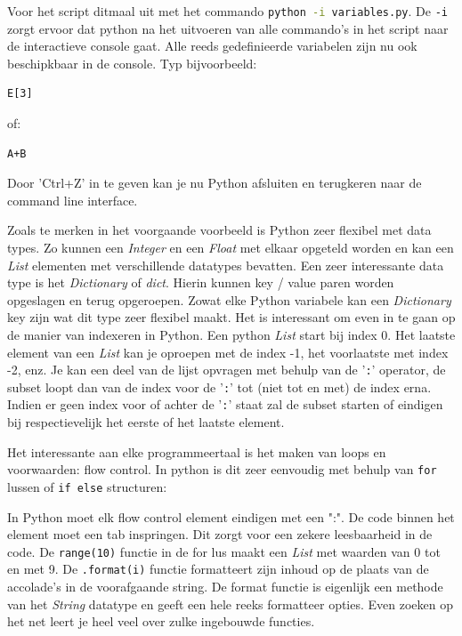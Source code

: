 \documentclass[11pt,twoside]{article}
\begin{document}
Voor het script ditmaal uit met het commando \lstinline[language=bash]{python -i variables.py}. De \lstinline[language=bash]{-i} zorgt ervoor dat python na het uitvoeren van alle commando's in het script naar de interactieve console gaat. Alle reeds gedefinieerde variabelen zijn nu ook beschipkbaar in de console. Typ bijvoorbeeld:
\begin{lstlisting}
E[3]
\end{lstlisting}
of:
\begin{lstlisting}
A+B
\end{lstlisting}
Door 'Ctrl+Z' in te geven kan je nu Python afsluiten en terugkeren naar de command line interface.

Zoals te merken in het voorgaande voorbeeld is Python zeer flexibel met data types. Zo kunnen een \emph{Integer} en een \emph{Float} met elkaar opgeteld worden en kan een \emph{List} elementen met verschillende datatypes bevatten. Een zeer interessante data type is het \emph{Dictionary} of \emph{dict}. Hierin kunnen key / value paren worden opgeslagen en terug opgeroepen. Zowat elke Python variabele kan een \emph{Dictionary} key zijn wat dit type zeer flexibel maakt. Het is interessant om even in te gaan op de manier van indexeren in Python. Een python \emph{List} start bij index 0. Het laatste element van een \emph{List} kan je oproepen met de index -1, het voorlaatste met index -2, enz. Je kan een deel van de lijst opvragen met behulp van de '\lstinline{:}' operator, de subset loopt dan van de index voor de '\lstinline{:}' tot (niet tot en met) de index erna. Indien er geen index voor of achter de '\lstinline{:}' staat zal de subset starten of eindigen bij respectievelijk het eerste of het laatste element.

Het interessante aan elke programmeertaal is het maken van loops en voorwaarden: flow control. In python is dit zeer eenvoudig met behulp van \lstinline{for} lussen of \lstinline{if else} structuren:


In Python moet elk flow control element eindigen met een ":". De code binnen het element moet een tab inspringen. Dit zorgt voor een zekere leesbaarheid in de code. De \lstinline{range(10)} functie in de for lus maakt een \emph{List} met waarden van 0 tot en met 9. De \lstinline{.format(i)} functie formatteert zijn inhoud op de plaats van de accolade's in de voorafgaande string. De format functie is eigenlijk een methode van het \emph{String} datatype en geeft een hele reeks formatteer opties. Even zoeken op het net leert je heel veel over zulke ingebouwde functies.
\end{document}
